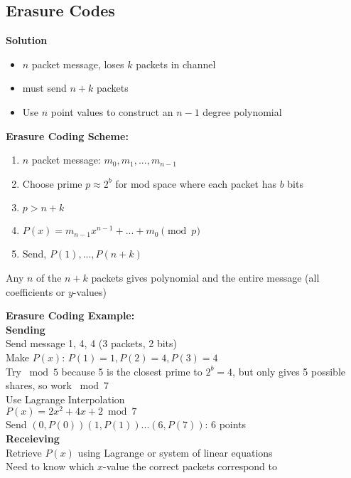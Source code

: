 \documentclass{article}\usepackage{amsmath,amssymb,amsthm,tikz,tkz-graph,color,chngpage,soul,hyperref,csquotes,graphicx,floatrow,polynom}\newcommand*{\QEDB}{\hfill\ensuremath{\square}}\newtheorem*{prop}{Proposition}\renewcommand{\theenumi}{\alph{enumi}}\usepackage[shortlabels]{enumitem}\usepackage[nobreak=true]{mdframed}\usetikzlibrary{matrix,calc}\MakeOuterQuote{"}\usepackage[margin=0.75in]{geometry} \newtheorem{theorem}{Theorem}
\begin{document}
\subsection*{Erasure Codes}
\textbf{Solution}
\begin{itemize}
\item $n$ packet message, loses $k$ packets in channel
\item must send $n+k$ packets
\item Use $n$ point values to construct an $n-1$ degree polynomial
\end{itemize}
\begin{mdframed}
\textbf{Erasure Coding Scheme:}
\begin{enumerate}[1.]
\item $n$ packet message: $m_0, m_1, ... , m_{n-1}$
\item Choose prime $p \approx 2^b$ for mod space where each packet has $b$ bits
\item $p > n+k$
\item $P(x) = m_{n-1}x^{n-1} + ... + m_0 \pmod{p}$
\item Send, $P(1), ..., P(n+k)$
\end{enumerate}
Any $n$ of the $n+k$ packets gives polynomial and the entire message (all coefficients or $y$-values)
\end{mdframed}
\begin{mdframed}
\textbf{Erasure Coding Example:}\\
\textbf{Sending}\\
Send message 1, 4, 4 (3 packets, 2 bits)\\
Make $P(x)$: $P(1) = 1, P(2) = 4, P(3) = 4$\\
Try $\bmod 5$ because 5 is the closest prime to $2^b = 4$, but only gives 5 possible shares, so work $\bmod 7$\\
Use Lagrange Interpolation\\
$P(x) = 2x^2 + 4x + 2 \bmod 7$\\
Send $(0, P(0))(1,P(1))...(6,P(7))$: 6 points\\
\textbf{Receieving}\\
Retrieve $P(x)$ using Lagrange or system of linear equations\\
Need to know which $x$-value the correct packets correspond to\\

\end{mdframed}
\end{document}
